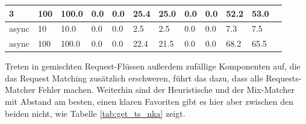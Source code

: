 \documentclass[12pt,a4paper]{report}
\begin{document}
\begin{table}[h]
\begin{tabular}{|l|l|l|l|l|l|l|l|l|l|l|l|}
		3                        & 100                                & 100.0                           & 0.0                         & 0.0                       & 25.4                           & 25.0   & 0.0 & 0.0    & 52.2 & 53.0   \\ \hline
		async                    & 10                                 & 10.0                            & 0.0                         & 0.0                       & 2.5                            & 2.5    & 0.0 & 0.0    & 7.3  & 7.5    \\ \hline
		async                    & 100                                & 100.0                           & 0.0                         & 0.0                       & 22.4                           & 21.5   & 0.0 & 0.0    & 68.2 & 65.5   \\ \hline
	\end{tabular}
\end{table}

Treten in gemischten Request-Flüssen außerdem zufällige Komponenten auf, die das Request Matching zusätzlich erschweren, führt das
dazu, dass alle Requests-Matcher Fehler machen. Weiterhin sind der Heuristische und der Mix-Matcher mit Abstand am besten, einen
klaren Favoriten gibt es hier aber zwischen den beiden nicht, wie Tabelle \ref{tab:get_ts_nka} zeigt.
\end{document}
